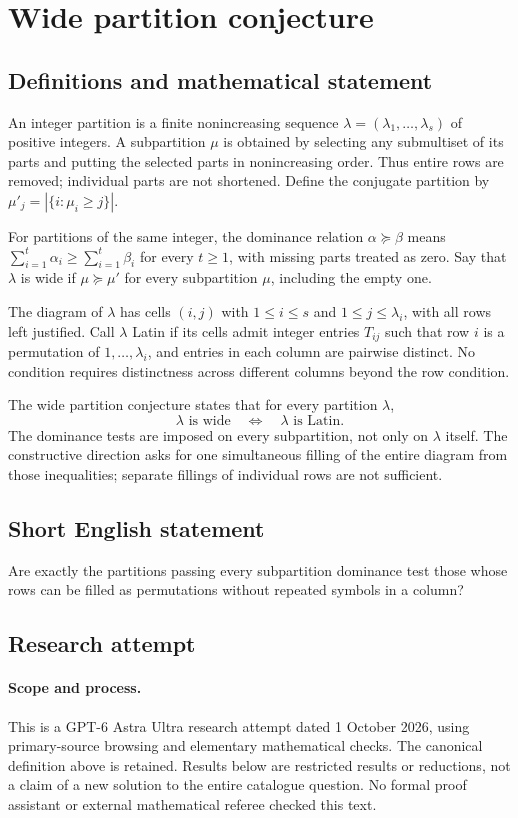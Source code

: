 \documentclass[11pt,a4paper]{article}
\begin{document}
\section*{Wide partition conjecture}\label{statement}

\subsection{Definitions and mathematical statement}
An integer partition is a finite nonincreasing sequence
$\lambda=(\lambda_1,\ldots,\lambda_s)$ of positive integers.
A subpartition $\mu$ is obtained by selecting any submultiset of its parts
and putting the selected parts in nonincreasing order. Thus entire rows
are removed; individual parts are not shortened. Define the conjugate
partition by $\mu'_j=|\{i:\mu_i\ge j\}|$.

For partitions of the same integer, the dominance relation $\alpha\succeq\beta$
means $\sum_{i=1}^t\alpha_i\ge\sum_{i=1}^t\beta_i$ for every $t\ge1$,
with missing parts treated as zero. Say that $\lambda$ is wide if
$\mu\succeq\mu'$ for every subpartition $\mu$, including the empty one.

The diagram of $\lambda$ has cells $(i,j)$ with $1\le i\le s$ and
$1\le j\le\lambda_i$, with all rows left justified. Call $\lambda$ Latin
if its cells admit integer entries $T_{ij}$ such that row $i$ is a
permutation of $1,\ldots,\lambda_i$, and entries in each column are
pairwise distinct. No condition requires distinctness across different
columns beyond the row condition.

The wide partition conjecture states that for every partition $\lambda$,
\[
 \lambda\text{ is wide}\quad\Longleftrightarrow\quad
 \lambda\text{ is Latin}.
\]
The dominance tests are imposed on every subpartition, not only on
$\lambda$ itself. The constructive direction asks for one simultaneous
filling of the entire diagram from those inequalities; separate fillings
of individual rows are not sufficient.
\subsection{Short English statement}
Are exactly the partitions passing every subpartition dominance test those whose rows can be filled as permutations without repeated symbols in a column?
\subsection{Research attempt}
\paragraph{Scope and process.}
This is a GPT-6 Astra Ultra research attempt dated 1 October 2026, using
primary-source browsing and elementary mathematical checks. The canonical
definition above is retained. Results below are restricted results or
reductions, not a claim of a new solution to the entire catalogue question.
No formal proof assistant or external mathematical referee checked this text.
\end{document}

